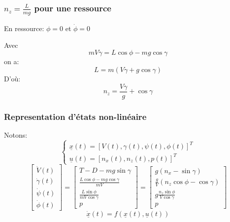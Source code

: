 \documentclass[footheight=2em]{beamer}
\begin{document}

\begin{frame}
    \frametitle{\(n_z = \frac{L}{mg}\) pour une ressource}\pause{}
    En ressource: \(\phi = 0\) et \(\dot{\phi} = 0\)\pause{}

    Avec \[ mV\dot{\gamma} = L\cos \phi - mg \cos \gamma \]
    on a:\[ L = m(V\dot{\gamma} + g \cos \gamma)\] \pause{}
    D'où:\[ \boxed{n_z = \frac{V\dot{\gamma}}{g} + \cos \gamma}\]
\end{frame}


\begin{frame}
    \frametitle{Representation d'états non-linéaire}\pause{}
    Notons:
    \[
    \left \{
    \begin{array}{l}
        \underline{x}(t) = {[V(t), \gamma (t), \psi (t), \phi (t)]}^{T}\\
        \underline{u}(t) = {[n_x(t), n_z(t), p(t)]}^{T}
    \end{array}
    \right.
    \]\pause{}
    \[
    \left[
    \begin{array}{c}
        \dot{V}(t)\\
        \dot{\gamma}(t)\\
        \dot{\psi}(t)\\
        \dot{\phi}(t)
    \end{array}
    \right]
    =
    \left[
    \begin{array}{c}
        T - D - mg \sin \gamma \\
        \frac{L\cos \phi - mg\cos \gamma}{mV} \\
        \frac{L\sin \phi}{mV\cos \gamma} \\
        p
    \end{array}
    \right]
    =
    \left[
    \begin{array}{c}
        g(n_x - \sin \gamma) \\
        \frac{g}{V}(n_z \cos \phi - \cos \gamma)\\
        g \frac{n_z \sin \phi}{V \cos \gamma} \\
        p
    \end{array}
    \right]
    \]\pause{}
    \[
    \underline{\dot{x}}(t)=f(\underline{x}(t),\underline{u}(t))
    \]
\end{frame}
\end{document}
